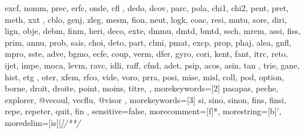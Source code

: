 {{      excf, nomm, prec, erfc, onde, cfl , dedo, dcov, parc,
      pola, chi1, chi2, pent, pret, meth, xxt , cblo, genj,
      zleg, mesm, fion, neut, logk, coac, resi, mutu, sore,
      diri, lign, obje, debm, finm, heri, deco, exte, dmmu,
      dmtd, bmtd, ssch, mrem, assi, fiss, prim, annu, prob,
      sais, choi, deto, part, clmi, pmat, excp, prop, phaj,
      alea, gnfl, mpro, sste, adve, bgmo, ecfe, coup, verm,
      dfer, gyro, cori, kent, fant, itrc, reto, ijet, impe,
      moca, levm, ravc, idli, raff, cfnd, adet, psip, acos,
      asin, tan , trie, gane, hist, etg , oter, xfem, rfco,
      vide, voro, prra, posi, mise, misl, coll, pod,  
      option, borne, droit, droite, point, moins, titre,
  },
  morekeywords=[2]{  %
    pasapas, peche, explorer, @vecoul, vecflu, @visor
  },
  morekeywords=[3]{  %
    si, sino, sinon, fins, finsi, repe, repeter, quit, fin
  },
  sensitive=false, %
  morecomment=[f]*, %
  morestring=[b]', %
  moredelim=[is][\sffamily\slshape\color{blue}]{/*}{*/}
}
